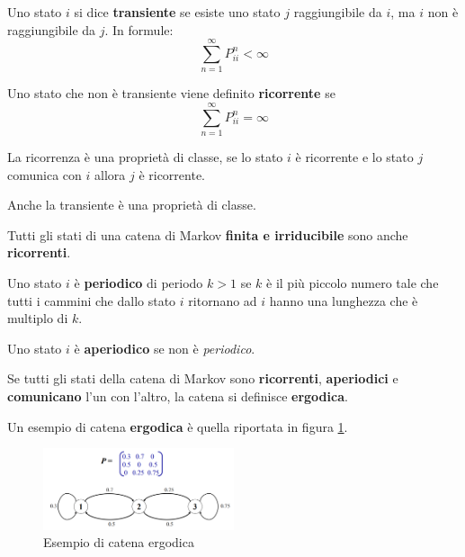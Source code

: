 \begin{definizione}
    Uno stato $i$ si dice \textbf{transiente} se esiste uno stato $j$ raggiungibile
    da $i$, ma $i$ non è raggiungibile da $j$. In formule:
    \begin{equation*}
        \sum_{n=1}^{\infty} P_{ii}^n < \infty
    \end{equation*}
\end{definizione}
\begin{definizione}
    Uno stato che non è transiente viene definito \textbf{ricorrente} se
    \begin{equation*}
        \sum_{n=1}^{\infty} P_{ii}^n = \infty
    \end{equation*}
\end{definizione}
\begin{nota}
    La ricorrenza è una proprietà di classe, se lo stato $i$ è ricorrente e
    lo stato $j$ comunica con $i$ allora $j$ è ricorrente.
\end{nota}
\begin{nota}
    Anche la transiente è una proprietà di classe.
\end{nota}
\begin{nota}
    Tutti gli stati di una catena di Markov \textbf{finita e irriducibile} sono
    anche \textbf{ricorrenti}.
\end{nota}
\begin{definizione}
    Uno stato $i$ è \textbf{periodico} di periodo $k > 1$ se $k$ è il più piccolo
    numero tale che tutti i cammini che dallo stato $i$ ritornano ad $i$ hanno una
    lunghezza che è multiplo di $k$.
\end{definizione}
\begin{definizione}
    Uno stato $i$ è \textbf{aperiodico} se non è \textit{periodico}.
\end{definizione}
\begin{definizione}
    Se tutti gli stati della catena di Markov sono \textbf{ricorrenti}, \textbf{aperiodici}
    e \textbf{comunicano} l'un con l'altro, la catena si definisce \textbf{ergodica}.
\end{definizione}
\begin{esempio}
    Un esempio di catena \textbf{ergodica} è quella riportata in figura \ref{fig:ergodic}.
    \begin{figure}[!ht]
        \centering
        \includegraphics[width=0.5\textwidth]{img/catene/catena_ergodica.png}
        \caption{Esempio di catena ergodica}
        \label{fig:ergodic}
    \end{figure}
\end{esempio}

